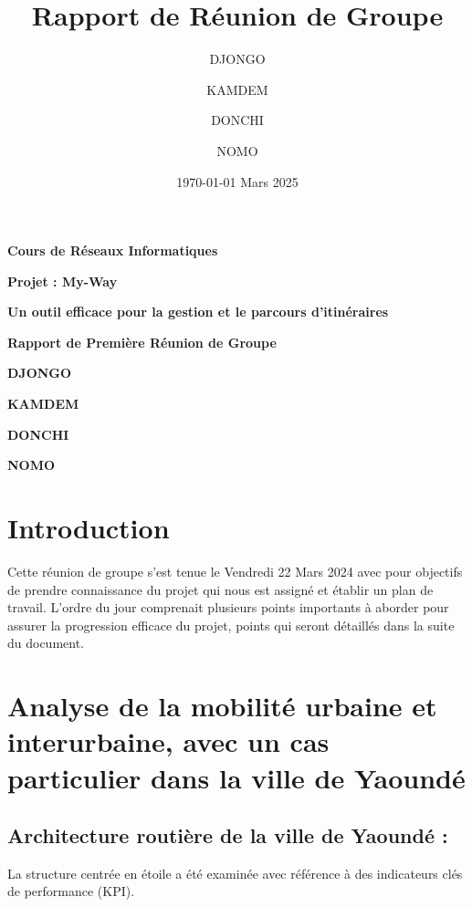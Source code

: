 \documentclass{article}
\title{Rapport de Réunion de Groupe}
\author{DJONGO \and KAMDEM \and DONCHI \and NOMO}
\date{\today}
\begin{document}
\begin{titlepage}
    \centering
    \vspace*{1cm}
    \Large\textbf{Cours de Réseaux Informatiques}\par
    \vspace{0.5cm}
    \Large\textbf{Projet : My-Way}\par
    \vspace{0.5cm}
    \Large\textbf{Un outil efficace pour la gestion et le parcours d'itinéraires}\par
    \vspace{1cm}
    \Large\textbf{Rapport de Première Réunion de Groupe}\par
    \vspace{1cm}
    \textbf{DJONGO}\par
    \textbf{KAMDEM}\par
    \textbf{DONCHI}\par
    \textbf{NOMO}\par
    \vspace{1cm}
\date{ Mars 2025} 
    \vfill
\end{titlepage}

\tableofcontents
\clearpage

\section*{Introduction}

Cette réunion de groupe s'est tenue le Vendredi 22 Mars 2024 avec pour objectifs de prendre connaissance du projet qui nous est assigné et établir un plan de travail. L'ordre du jour comprenait plusieurs points importants à aborder pour assurer la progression efficace du projet, points qui seront détaillés dans la suite du document.
\newpage

\section{Analyse de la mobilité urbaine et interurbaine, avec un cas particulier dans la ville de Yaoundé}

\subsection{Architecture routière de la ville de Yaoundé :}
La structure centrée en étoile a été examinée avec référence à des indicateurs clés de performance (KPI).
\end{document}
